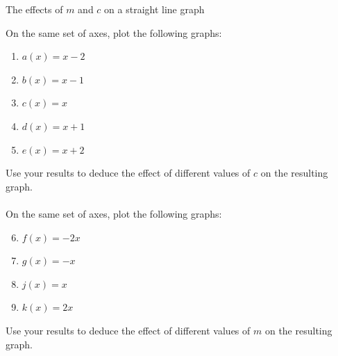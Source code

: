 \begin{Investigation}{The effects of $m$ and $c$ on a straight line graph}

On the same set of axes, plot the following graphs:
\begin{enumerate}[noitemsep, label=\textbf{\arabic*}. ] 

    \item $a(x)=x-2$
    \item $b(x)=x-1$
    \item $c(x)=x$
    \item $d(x)=x+1$
    \item $e(x)=x+2$
    \end{enumerate}
Use your results to deduce the effect of different values of $c$ on the resulting graph.\\
\\

On the same set of axes, plot the following graphs:

    \begin{enumerate}[noitemsep, label=\textbf{\arabic*}. ] 
\setcounter{enumi}{5}
    \item $f(x)=-2x$
    \item $g(x)=-x$
    \item $j(x)=x$
\item $k(x)=2x$
    \end{enumerate}
Use your results to deduce the effect of different values of $m$ on the resulting graph.
\end{Investigation}


